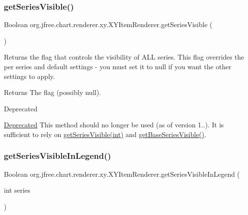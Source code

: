 \subsubsection{\texorpdfstring{get\+Series\+Visible()}{getSeriesVisible()}\hspace{0.1cm}{\footnotesize\ttfamily [2/2]}}
{\footnotesize\ttfamily Boolean org.\+jfree.\+chart.\+renderer.\+xy.\+X\+Y\+Item\+Renderer.\+get\+Series\+Visible (\begin{DoxyParamCaption}{ }\end{DoxyParamCaption})}

Returns the flag that controls the visibility of A\+LL series. This flag overrides the per series and default settings -\/ you must set it to {\ttfamily null} if you want the other settings to apply.

\begin{DoxyReturn}{Returns}
The flag (possibly {\ttfamily null}).
\end{DoxyReturn}
\begin{DoxyRefDesc}{Deprecated}
\item[\mbox{\hyperlink{deprecated__deprecated000213}{Deprecated}}]This method should no longer be used (as of version 1..). It is sufficient to rely on \mbox{\hyperlink{interfaceorg_1_1jfree_1_1chart_1_1renderer_1_1xy_1_1_x_y_item_renderer_acb62c922b439c9311e3e71d2d69b0823}{get\+Series\+Visible(int)}} and \mbox{\hyperlink{interfaceorg_1_1jfree_1_1chart_1_1renderer_1_1xy_1_1_x_y_item_renderer_a7703af7b787a8cc46ec822c840e2f79c}{get\+Base\+Series\+Visible()}}. \end{DoxyRefDesc}
\mbox{\label{interfaceorg_1_1jfree_1_1chart_1_1renderer_1_1xy_1_1_x_y_item_renderer_a97403e6361d393a47b63139499d71b06}} 
\subsubsection{\texorpdfstring{get\+Series\+Visible\+In\+Legend()}{getSeriesVisibleInLegend()}\hspace{0.1cm}{\footnotesize\ttfamily [1/2]}}
{\footnotesize\ttfamily Boolean org.\+jfree.\+chart.\+renderer.\+xy.\+X\+Y\+Item\+Renderer.\+get\+Series\+Visible\+In\+Legend (\begin{DoxyParamCaption}\item[{int}]{series }\end{DoxyParamCaption})}

